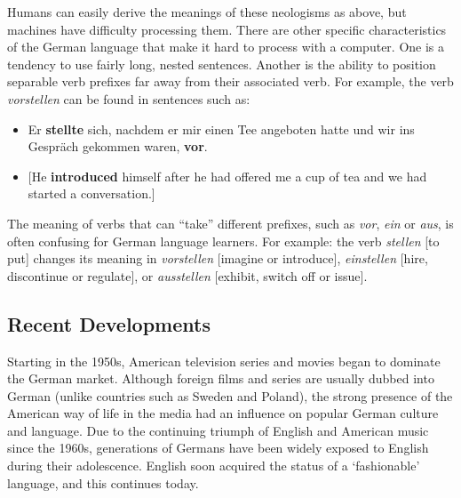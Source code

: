 \documentclass[]{../../metanetpaper}
\begin{document}
\begin{multicols}{2}
Humans can easily derive the meanings of these neologisms as above, but machines have difficulty processing them. There are other specific characteristics of the German language that make it hard to process with a computer. One is a tendency to use fairly long, nested sentences. Another is the ability to position separable verb prefixes far away from their associated verb. For example, the verb \textit{vorstellen} can be found in sentences such as:

\begin{itemize}
\item Er \textbf{stellte} sich, nachdem er mir einen Tee angeboten hatte und wir ins Gespräch gekommen waren, \textbf{vor}.
\item {[}He \textbf{introduced} himself after he had offered me a cup of tea and we had started a conversation.{]} 
\end{itemize}

The meaning of verbs that can “take” different prefixes, such as \textit{vor}, \textit{ein} or \textit{aus}, is often confusing for German language learners. For example: the verb \textit{stellen} {[}to put{]} changes its meaning in \textit{vorstellen} {[}imagine or introduce{]}, \textit{einstellen} {[}hire, discontinue or regulate{]}, or \textit{ausstellen} {[}exhibit, switch off or issue{]}.


\subsection{Recent Developments}

Starting in the 1950s, American television series and movies began to dominate the German market. Although foreign films and series are usually dubbed into German (unlike countries such as Sweden and Poland), the strong presence of the American way of life in the media had an influence on popular German culture and language. Due to the continuing triumph of English and American music since the 1960s, generations of Germans have been widely exposed to English during their adolescence. English soon acquired the status of a ‘fashionable’ language, and this continues today.


\end{multicols}
\end{document}
